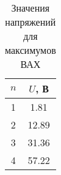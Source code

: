\begin{table}[]
    \centering
    \begin{tabular}{|c|c|}
    \hline
    $n$ & $U$, В     \\ \hline
    1   & 1.81       \\ \hline
    2   & 12.89      \\ \hline
    3   & 31.36      \\ \hline
    4   & 57.22      \\ \hline
    \end{tabular}
    \caption{Значения напряжений для максимумов ВАХ}
\end{table}
